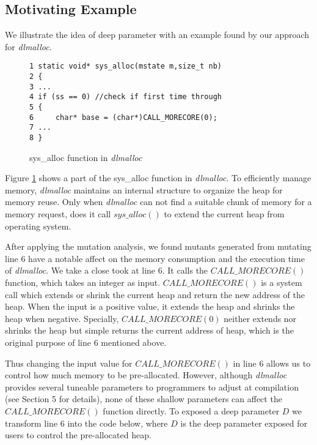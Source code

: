 
\subsection{Motivating Example}

We illustrate the idea of deep parameter with an example found by our approach for \emph{dlmalloc}.

\begin{figure}[ht]
\begin{lstlisting}
1 static void* sys_alloc(mstate m,size_t nb) 
2 {
3 ...
4 if (ss == 0) //check if first time through
5 { 
6     char* base = (char*)CALL_MORECORE(0);
7 ...
8 }

\end{lstlisting}
\label{exp}
\caption{sys\_alloc function in \emph{dlmalloc}}
\end{figure}

Figure \ref{exp} shows a part of the sys\_alloc function in \emph{dlmalloc}. To efficiently manage memory, \emph{dlmalloc} maintains an internal structure to organize the heap for memory reuse. Only when \emph{dlmalloc} can not find a suitable chunk of memory for a memory request, does it call $sys\_alloc()$ to extend the current heap from operating system.

After applying the mutation analysis, we found mutants generated from mutating line 6 have a notable affect on the memory consumption and the execution time of \emph{dlmalloc}. We take a close took at line 6. It calls the $CALL\_MORECORE()$ function, which takes an integer as input. $CALL\_MORECORE()$ is a system call which extends or shrink the current heap and return the new address of the heap. When the input is a positive value, it extends the heap and shrinks the heap when negative. Specially, $CALL\_MORECORE(0)$ neither extends nor shrinks the heap but simple returns the current address of heap, which is the original purpose of line 6 mentioned above.

Thus changing the input value for $CALL\_MORECORE()$ in line 6 allows us to control how much memory to be pre-allocated. However, although \emph{dlmalloc} provides several tuneable parameters to programmers to adjust at compilation (see Section 5 for details), none of these shallow parameters can affect the $CALL\_MORECORE()$ function directly. To exposed a deep parameter $D$ we transform line 6 into the code below, where $D$ is the deep parameter exposed for users to control the pre-allocated heap.

